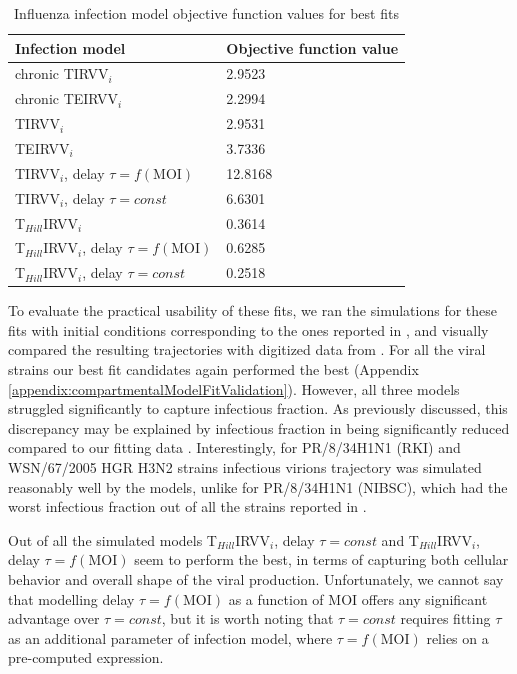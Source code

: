 \begin{table}[h!]
\centering
\caption[Influenza infection model objective function values for best fits]{Influenza infection model objective function values for best fits}
\label{table:ModelObjFunction}

\begin{tabular}{p{8cm} p{3cm}}
\hline 
\textbf{Infection model} & \textbf{Objective function value}\\
\hline
chronic TIRVV$_i$ & 2.9523\\
chronic TEIRVV$_i$ & 2.2994\\
\hline
TIRVV$_i$ & 2.9531\\
TEIRVV$_i$ &  3.7336\\
TIRVV$_i$, delay $\tau = f(\text{MOI})$ & 12.8168\\
TIRVV$_i$, delay $\tau = const$ & 6.6301\\
T$_{Hill}$IRVV$_i$ & 0.3614\\
T$_{Hill}$IRVV$_i$, delay $\tau = f(\text{MOI})$ & 0.6285\\
T$_{Hill}$IRVV$_i$, delay $\tau = const$ & 0.2518\\
\hline
\end{tabular}
\end{table}

To evaluate the practical usability of these fits, we ran the simulations for these fits with initial conditions corresponding to the ones reported in \cite{schulze2009infection}, and visually compared the resulting trajectories with digitized data from \cite{schulze2009infection}. For all the viral strains our best fit candidates again performed the best (Appendix \ref{appendix:compartmentalModelFitValidation}). However, all three models struggled significantly to capture infectious fraction. As previously discussed, this discrepancy may be explained by infectious fraction in \cite{schulze2009infection} being significantly reduced compared to our fitting data \cite{rudiger2019multiscale}. Interestingly, for PR/8/34H1N1 (RKI) and WSN/67/2005 HGR H3N2 strains infectious virions trajectory was simulated reasonably well by the models, unlike for PR/8/34H1N1 (NIBSC), which had the worst infectious fraction out of all the strains reported in \cite{schulze2009infection}.

Out of all the simulated models T$_{Hill}$IRVV$_i$, delay $\tau = const$ and T$_{Hill}$IRVV$_i$, delay $\tau = f(\text{MOI})$ seem to perform the best, in terms of capturing both cellular behavior and overall shape of the viral production. Unfortunately, we cannot say that modelling delay $\tau = f(\text{MOI})$ as a function of MOI offers any significant advantage over $\tau = const$, but it is worth noting that $\tau = const$ requires fitting $\tau$ as an additional parameter of infection model, where $\tau = f(\text{MOI})$ relies on a pre-computed expression.

